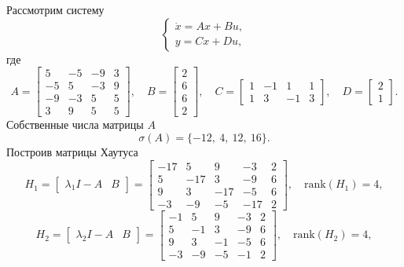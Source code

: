 Рассмотрим систему 
\begin{equation}
    \begin{cases}
        \dot x = Ax+Bu,\\
        y = Cx +Du,
    \end{cases}
    \label{eq:3}
\end{equation}
где
\begin{equation*}
    A=\begin{bmatrix}
        5& -5& -9& 3\\
        -5& 5& -3& 9\\
        -9& -3& 5& 5\\
        3& 9& 5& 5
    \end{bmatrix},\quad
    B=\begin{bmatrix}
        2\\
        6\\
        6\\
        2
    \end{bmatrix},\quad
    C=\begin{bmatrix}
        1& -1& 1& 1\\
        1& 3& -1& 3
    \end{bmatrix},\quad
    D=\begin{bmatrix}
        2\\1
    \end{bmatrix}.
\end{equation*}
Собственные числа матрицы $A$
\begin{equation*}
    \sigma(A)=\{-12,\ 4,\ 12,\ 16\}.
\end{equation*}
Построив матрицы Хаутуса
\begin{equation*}
H_1 = \begin{bmatrix}
    \lambda_1 I - A & B
    \end{bmatrix} =
\begin{bmatrix}
-17 & 5 & 9 & -3 & 2 \\
5 & -17 & 3 & -9 & 6 \\
9 & 3 & -17 & -5 & 6 \\
-3 & -9 & -5 & -17 & 2
\end{bmatrix},\quad
\text{rank}(H_1) = 4,
\end{equation*}
\begin{equation*}
H_2 = \begin{bmatrix}
    \lambda_2 I - A & B
    \end{bmatrix} =
\begin{bmatrix}
-1 & 5 & 9 & -3 & 2 \\
5 & -1 & 3 & -9 & 6 \\
9 & 3 & -1 & -5 & 6 \\
-3 & -9 & -5 & -1 & 2
\end{bmatrix},\quad
\text{rank}(H_2) = 4,
\end{equation*}
